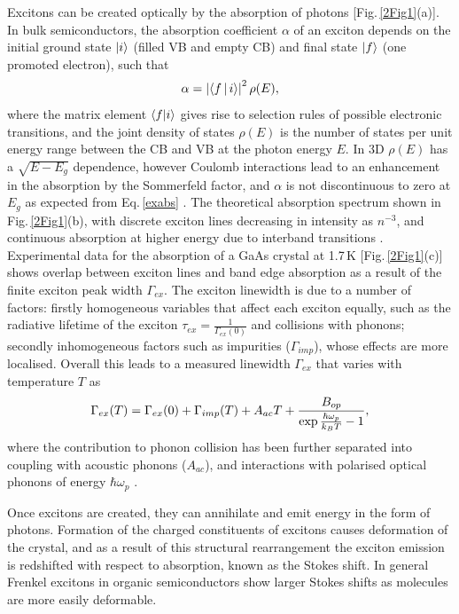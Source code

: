 Excitons can be created optically by the absorption of photons [Fig.\,\ref{2Fig1}(a)]. In bulk semiconductors, the absorption coefficient $\alpha$ of an exciton depends on the initial ground state $\ket{i}$ (filled VB and empty CB) and final state $\ket{f}$ (one promoted electron), such that
\begin{equation}
\centering
\alpha = \left| \Braket{f | i} \right|^2 \rho(E) ,
\label{exabs}
\end{equation}
where the matrix element $\braket{f | i}$ gives rise to selection rules of possible electronic transitions, and the joint density of states $\rho(E)$ is the number of states per unit energy range between the CB and VB at the photon energy $E$. In 3D $\rho(E)$ has a $\sqrt{E-E_g}$ dependence, however Coulomb interactions lead to an enhancement in the absorption by the Sommerfeld factor, and $\alpha$ is not discontinuous to zero at $E_g$ as expected from Eq.\,\ref{exabs} \cite{Bassu1997}. The theoretical absorption spectrum shown in Fig.\,\ref{2Fig1}(b), with discrete exciton lines decreasing in intensity as $n^{-3}$, and continuous absorption at higher energy due to interband transitions \cite{Bassu1997}. Experimental data for the absorption of a GaAs crystal at 1.7\,K [Fig.\,\ref{2Fig1}(c)] shows overlap between exciton lines and band edge absorption as a result of the finite exciton peak width $\Gamma_{ex}$. The exciton linewidth is due to a number of factors: firstly homogeneous variables that affect each exciton equally, such as the radiative lifetime of the exciton $\tau_{ex} = \frac{1}{\Gamma_{ex}(0)}$ and collisions with phonons; secondly inhomogeneous factors such as impurities ($\Gamma_{imp}$), whose effects are more localised. Overall this leads to a measured linewidth $\Gamma_{ex}$ that varies with temperature $T$ as
\begin{equation}
\centering
\Gamma_{ex}(T) = \Gamma_{ex}(0) +  \Gamma_{imp}(T) +A_{ac}T + \frac{B_{op}}{\exp{\frac{\hbar\omega_p}{k_B T}}-1},
\label{exwidth}
\end{equation}
where the contribution to phonon collision has been further separated into coupling with acoustic phonons ($A_{ac}$), and interactions with polarised optical phonons of energy $\hbar\omega_p$ \cite{Dammak2009}. 

Once excitons are created, they can annihilate and emit energy in the form of photons. Formation of the charged constituents of excitons causes deformation of the crystal, and as a result of this structural rearrangement the exciton emission is redshifted with respect to absorption, known as the Stokes shift. In general Frenkel excitons in organic semiconductors show larger Stokes shifts as molecules are more easily deformable.

